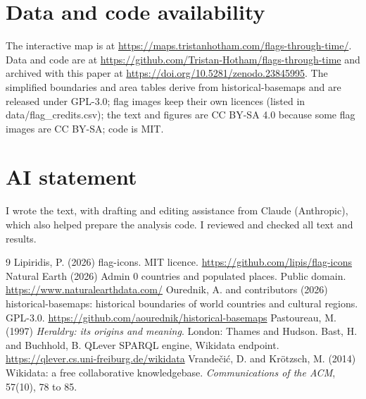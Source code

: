 \documentclass[11pt,a4paper]{article}
\begin{document}
\section*{Data and code availability}
The interactive map is at \url{https://maps.tristanhotham.com/flags-through-time/}. Data and code are at \url{https://github.com/Tristan-Hotham/flags-through-time} and archived with this paper at \url{https://doi.org/10.5281/zenodo.23845995}. The simplified boundaries and area tables derive from historical-basemaps and are released under GPL-3.0; flag images keep their own licences (listed in data/flag\_credits.csv); the text and figures are CC BY-SA 4.0 because some flag images are CC BY-SA; code is MIT.

\section*{AI statement}
I wrote the text, with drafting and editing assistance from Claude (Anthropic), which also helped prepare the analysis code. I reviewed and checked all text and results.

\begin{thebibliography}{9}
 Lipiridis, P. (2026) flag-icons. MIT licence. \url{https://github.com/lipis/flag-icons}
 Natural Earth (2026) Admin 0 countries and populated places. Public domain. \url{https://www.naturalearthdata.com/}
 Ourednik, A. and contributors (2026) historical-basemaps: historical boundaries of world countries and cultural regions. GPL-3.0. \url{https://github.com/aourednik/historical-basemaps}
 Pastoureau, M. (1997) \emph{Heraldry: its origins and meaning}. London: Thames and Hudson.
 Bast, H. and Buchhold, B. QLever SPARQL engine, Wikidata endpoint. \url{https://qlever.cs.uni-freiburg.de/wikidata}
 Vrande\v{c}i\'c, D. and Kr\"otzsch, M. (2014) Wikidata: a free collaborative knowledgebase. \emph{Communications of the ACM}, 57(10), 78 to 85.
\end{thebibliography}
\end{document}
